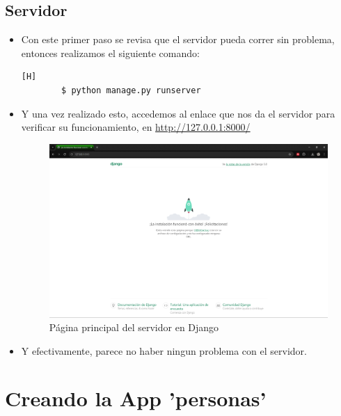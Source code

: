 \documentclass{article}
\begin{document}
        \subsection{Servidor}
        \begin{itemize}
            \item Con este primer paso se revisa que el servidor pueda correr sin problema, entonces realizamos el siguiente comando:
        
        \begin{lstlisting}[language=bash,caption={Activación del servidor}][H]
        $ python manage.py runserver
        \end{lstlisting}
    
            \item Y una vez realizado esto, accedemos al enlace que nos da el servidor para verificar su funcionamiento, en \url{http://127.0.0.1:8000/}
        
        \begin{figure}[H]
            \centering
            \includegraphics[width=1\linewidth]{img/Django_site.png}
            \caption{Página principal del servidor en Django}
            \label{fig:enter-label}
        \end{figure}

            \item Y efectivamente, parece no haber ningun problema con el servidor.
        \end{itemize}

    
    \section{Creando la App 'personas'}
\end{document}
